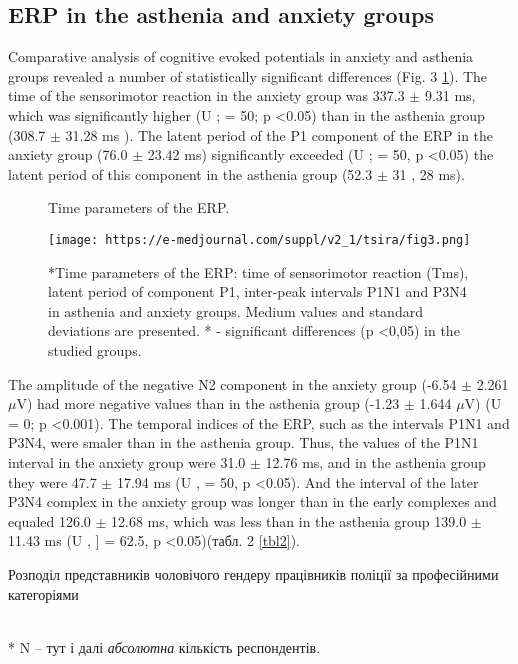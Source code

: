 \documentclass[twocolumn]{article}
\begin{document}
\subsection {	ERP in the asthenia and anxiety groups}
\par 	Comparative analysis of cognitive evoked potentials in anxiety and asthenia groups revealed a number of statistically significant differences (Fig. 3 \ref{fig3}). The time of the sensorimotor reaction in the anxiety group was 337.3 $\pm$ 9.31 ms, which was significantly higher (U \cite{bib15}; \cite{bib15} = 50; p \textless{}0.05) than in the asthenia group (308.7 $\pm$ 31.28 ms ). The latent period of the P1 component of the ERP in the anxiety group (76.0 $\pm$ 23.42 ms) significantly exceeded (U \cite{bib15}; \cite{bib15} = 50, p \textless{}0.05) the latent period of this component in the asthenia group (52.3 $\pm$ 31 , 28 ms). 
\begin{figure}
\caption{Time parameters of the ERP.}
\label{fig3}
\texttt{[image: https://e-medjournal.com/suppl/v2\_1/tsira/fig3.png]}
\caption*{*Time parameters of the ERP: time of sensorimotor reaction (T\textunderscore{}ms), latent period of component P1, inter-peak intervals P1N1 and P3N4 in asthenia and anxiety groups. Medium values and standard deviations are presented. * - significant differences (p \textless{}0,05) in the studied groups. }
\end{figure}
\par The amplitude of the negative N2 component in the anxiety group (-6.54 $\pm$ 2.261 $\mu$V) had more negative values than in the asthenia group (-1.23 $\pm$ 1.644 $\mu$V) (U \cite{bib15} = 0; p \textless{}0.001). The temporal indices of the ERP, such as the intervals P1N1 and P3N4, were smaler than in the asthenia group. Thus, the values of the P1N1 interval in the anxiety group were 31.0 $\pm$ 12.76 ms, and in the asthenia group they were 47.7 $\pm$ 17.94 ms (U \cite{bib15}, \cite{bib15} = 50, p \textless{}0.05). And the interval of the later P3N4 complex  in the anxiety group was longer than in the early complexes and equaled 126.0 $\pm$ 12.68 ms, which was less than in the asthenia group 139.0 $\pm$ 11.43 ms (U \cite{bib15}, \cite{bib15} ] = 62.5, p \textless{}0.05)(табл. 2 \ref{tbl2}).
\begin{table*}
\caption{Розподіл представників чоловічого гендеру працівників поліції за професійними категоріями \cite{bib2}}
\label{tbl2}\centering
\\
\caption*{* N – тут і далі \textit{абсолютна} кількість респондентів.}

\end{table*}
\end{document}
